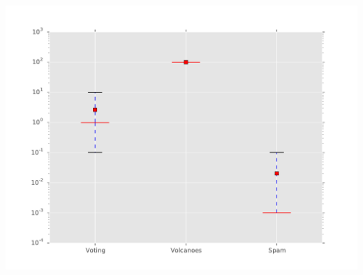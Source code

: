 \documentclass[12pt]{article}
\begin{document}
\begin{enumerate}
\begin{enumerate}
                \includegraphics[width=\linewidth]{lambdachoices.pdf}
        \end{enumerate}


\end{enumerate}
\end{document}
